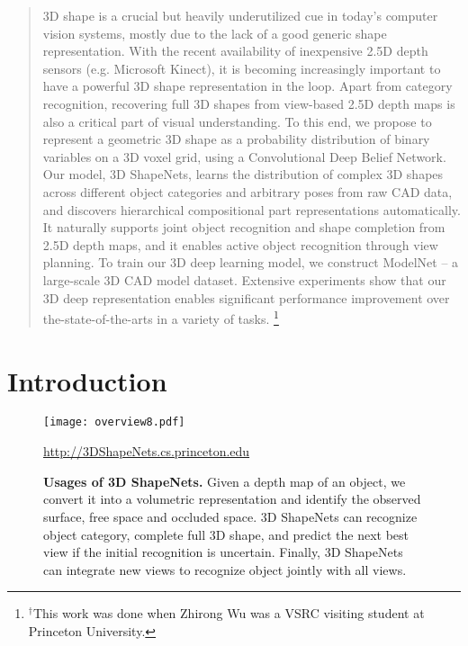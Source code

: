 \documentclass[10pt,twocolumn,letterpaper]{article}
\newcommand\blfootnote[1]{\begingroup
  \renewcommand\thefootnote{}\footnote{#1}\addtocounter{footnote}{-1}\endgroup
}
\begin{document}
\begin{abstract}
3D shape is a crucial but heavily underutilized cue in today's computer vision systems,
mostly due to the lack of a good generic shape representation.
With the recent availability of inexpensive 2.5D depth sensors (e.g. Microsoft Kinect),
it is becoming increasingly important to have a powerful 3D shape representation in the loop.
Apart from category recognition, recovering full 3D shapes from view-based 2.5D depth maps is also a critical part of visual understanding. To this end, we propose to represent a geometric 3D shape as a probability distribution of binary variables on a 3D voxel grid, using a Convolutional Deep Belief Network. 
Our model, 3D ShapeNets, learns the distribution of complex 3D shapes across different object categories and arbitrary poses from raw CAD data,
and discovers hierarchical compositional part representations automatically. 
It naturally supports joint object recognition and shape completion from 2.5D depth maps, and it enables active object recognition through view planning.
To train our 3D deep learning model, 
we construct ModelNet -- a large-scale 3D CAD model dataset.
Extensive experiments show that our 3D deep representation enables significant performance improvement over the-state-of-the-arts in a variety of tasks.
\blfootnote{$^{\dagger}$This work was done when Zhirong Wu was a VSRC visiting student at Princeton University.}
\end{abstract}


\section{Introduction}

\begin{figure}[t]
\centering

\texttt{[image: overview8.pdf]}

\normalsize\href{http://3DShapeNets.cs.princeton.edu}{http://3DShapeNets.cs.princeton.edu}

\vspace{-1mm}
\caption{{\bf Usages of 3D ShapeNets.}
Given a depth map of an object, we convert it into a volumetric representation and identify the observed surface, free space and occluded space. 
3D ShapeNets can recognize object category, complete full 3D shape, 
and predict the next best view if the initial recognition is uncertain. 
Finally, 3D ShapeNets can integrate new views to recognize object jointly with all views.
}

\label{fig:teaser}
\end{figure}
\end{document}
